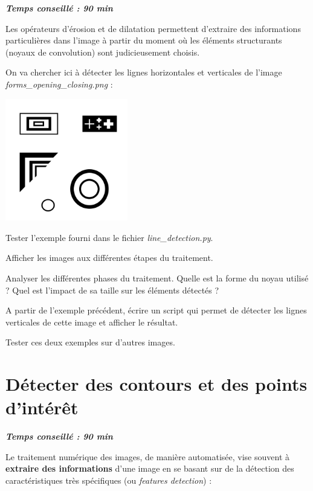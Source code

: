 \documentclass[a4paper,11pt,titlepage]{article} %
\begin{document}
\begin{center} \textbf{\textit{Temps conseillé : 90 min}} \end{center}

Les opérateurs d'érosion et de dilatation permettent d'extraire des informations particulières dans l'image à partir du moment où les éléments structurants (noyaux de convolution) sont judicieusement choisis.

On va chercher ici à détecter les lignes horizontales et verticales de l'image \textsl{\textit{forms\_opening\_closing.png}} :

\begin{center}
	\includegraphics[width=0.4\textwidth]{images/forms_opening_closing_inv.png}
\end{center}


\Manip Tester l'exemple fourni dans le fichier \textsl{line\_detection.py}.

\Manip Afficher les images aux différentes étapes du traitement.

\Quest Analyser les différentes phases du traitement. Quelle est la forme du noyau utilisé ? Quel est l'impact de sa taille sur les éléments détectés ?

\Manip A partir de l'exemple précédent, écrire un script qui permet de détecter les lignes verticales de cette image et afficher le résultat.

\Manip Tester ces deux exemples sur d'autres images.


\newpage
\section{Détecter des contours et des points d'intérêt}

\begin{center} \textbf{\textit{Temps conseillé : 90 min}} \end{center}

Le traitement numérique des images, de manière automatisée, vise souvent à \textbf{extraire des informations} d'une image en se basant sur de la {détection des caractéristiques} très spécifiques (ou \textit{features detection}) : 
\end{document}
